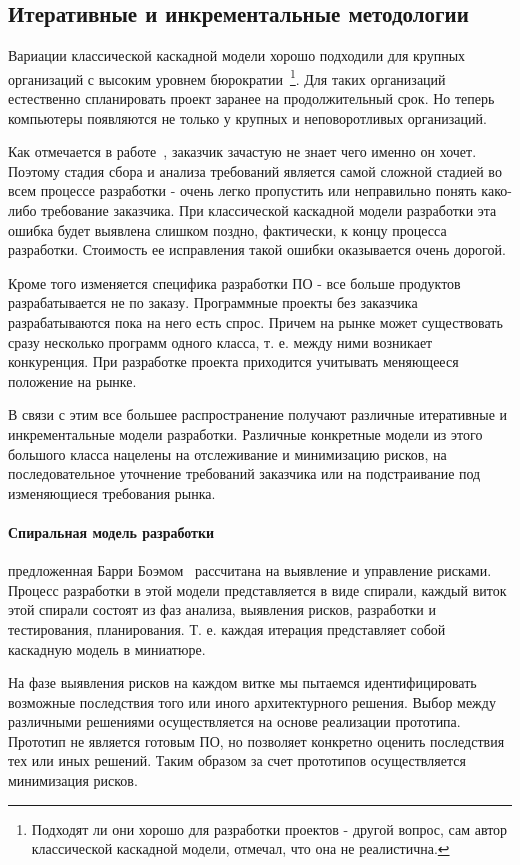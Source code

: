 \subsection{Итеративные и инкрементальные методологии}

Вариации классической каскадной модели хорошо подходили для крупных организаций с высоким уровнем бюрократии~\footnote{Подходят ли они хорошо для разработки проектов - другой вопрос, сам автор классической каскадной модели, отмечал, что она не реалистична.}. Для таких организаций естественно спланировать проект заранее на продолжительный срок. Но теперь компьютеры появляются не только у крупных и неповоротливых организаций.

Как отмечается в работе~\cite{Brooks:1987:NSB}, заказчик зачастую не знает чего именно он хочет. Поэтому стадия сбора и анализа требований является самой сложной стадией во всем процессе разработки - очень легко пропустить или неправильно понять како-либо требование заказчика. При классической каскадной модели разработки эта ошибка будет выявлена слишком поздно, фактически, к концу процесса разработки. Стоимость ее исправления такой ошибки оказывается очень дорогой.

Кроме того изменяется специфика разработки ПО - все больше продуктов разрабатывается не по заказу. Программные проекты без заказчика разрабатываются пока на него есть спрос. Причем на рынке может существовать сразу несколько программ одного класса, т. е. между ними возникает конкуренция. При разработке проекта приходится учитывать меняющееся положение на рынке.

В связи с этим все большее распространение получают различные итеративные и инкрементальные модели разработки. Различные конкретные модели из этого большого класса нацелены на отслеживание и минимизацию рисков, на последовательное уточнение требований заказчика или на подстраивание под изменяющиеся требования рынка.

\paragraph{Спиральная модель разработки} предложенная Барри Боэмом~\cite{Boehm:1988:SMSD} рассчитана на выявление и управление рисками. Процесс разработки в этой модели представляется в виде спирали, каждый виток этой спирали состоят из фаз анализа, выявления рисков, разработки и тестирования, планирования. Т. е. каждая итерация представляет собой каскадную модель в миниатюре.

На фазе выявления рисков на каждом витке мы пытаемся идентифицировать возможные последствия того или иного архитектурного решения. Выбор между различными решениями осуществляется на основе реализации прототипа. Прототип не является готовым ПО, но позволяет конкретно оценить последствия тех или иных решений. Таким образом за счет прототипов осуществляется минимизация рисков.

